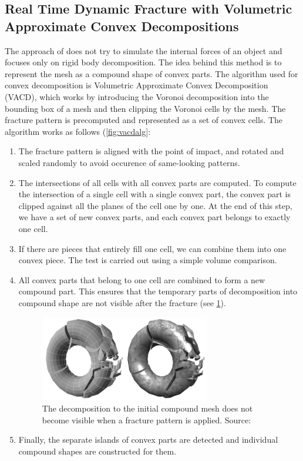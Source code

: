 \subsection{Real Time Dynamic Fracture
with Volumetric Approximate Convex Decompositions}
\label{sec:RTDF}
The approach of \citet{nvidia} does not try to simulate the internal forces of an object and focuses only on rigid body decomposition. The idea behind this method is to represent the mesh as a compound shape of convex parts. The algorithm used for convex decomposition is Volumetric Approximate Convex Decomposition (VACD), which works by introducing the Voronoi decomposition into the bounding box of a mesh and then clipping the Voronoi cells by the mesh. The fracture pattern is precomputed and represented as a set of convex cells. The algorithm works as follows (\cref{fig:vacdalg}:
\begin{enumerate}
\item The fracture pattern is aligned with the point of impact, and rotated and scaled randomly to avoid occurence of same-looking patterns.
\item The intersections of all cells with all convex parts are computed. To compute the intersection of a single cell with a single convex part, the convex part is clipped against all the planes of the cell one by one. 
At the end of this step, we have a set of new convex parts, and each convex part belongs to exactly one cell. 
\item If there are pieces that entirely fill one cell, we can combine them into one convex piece. The test is carried out using a simple volume comparison.
\item All convex parts that belong to one cell are combined to form a new compound part. This ensures that the temporary parts of decomposition into compound shape are not visible after the fracture (see \cref{fig:vacdfracture}).
\begin{figure}
        \centering
        \includegraphics[width=0.7\textwidth]{img/vacdfracture}
        \caption{The decomposition to the
initial compound mesh does not become visible when a fracture
pattern is applied. Source: \citet{nvidia}}
        \label{fig:vacdfracture}
\end{figure}
\item Finally, the separate islands of convex parts are detected and individual compound shapes are constructed for them.
\end{enumerate}

